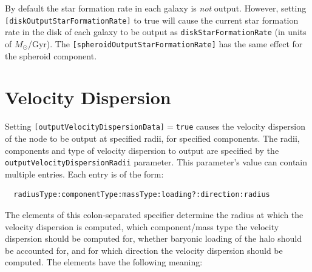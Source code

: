 By default the star formation rate in each galaxy is \emph{not} output. However, setting {\tt [diskOutputStarFormationRate]} to true will cause the current star formation rate in the disk of each galaxy to be output as {\tt diskStarFormationRate} (in units of $M_\odot$/Gyr). The {\tt [spheroidOutputStarFormationRate]} has the same effect for the spheroid component.

\section{Velocity Dispersion}

Setting {\tt [outputVelocityDispersionData]}$=${\tt true} causes the velocity dispersion of the node to be output at specified radii, for specified components. The radii, components and type of velocity dispersion to output are specified by the {\tt outputVelocityDispersionRadii} parameter. This parameter's value can contain multiple entries. Each entry is of the form:
\begin{verbatim}
  radiusType:componentType:massType:loading?:direction:radius
\end{verbatim}
The elements of this colon-separated specifier determine the radius at which the velocity dispersion is computed, which component/mass type the velocity dispersion should be computed for, whether baryonic loading of the halo should be accounted for, and for which direction the velocity dispersion should be computed. The elements have the following meaning:
